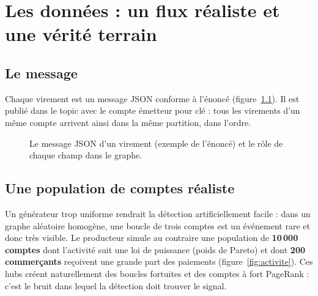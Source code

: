 \chapter{Les données : un flux réaliste et une vérité terrain}
\label{ch:donnees}

\section{Le message}
Chaque virement est un message JSON conforme à l'énoncé
(figure~\ref{fig:json}). Il est publié dans le topic 
avec le compte émetteur pour clé : tous les virements d'un même compte
arrivent ainsi dans la même partition, dans l'ordre.

\begin{figure}[htp]
\centering
{}
\caption[Le message JSON d'un virement]{Le message JSON d'un virement (exemple de l'énoncé) et le
rôle de chaque champ dans le graphe.}
\label{fig:json}
\end{figure}

\section{Une population de comptes réaliste}
Un générateur trop uniforme rendrait la détection artificiellement facile :
dans un graphe aléatoire homogène, une boucle de trois comptes est un
événement rare et donc très visible. Le producteur simule au contraire une
population de \textbf{10\,000 comptes} dont l'activité suit une loi de
puissance (poids de Pareto) et dont \textbf{200 commerçants} reçoivent une
grande part des paiements (figure~\ref{fig:activite}). Ces hubs créent
naturellement des boucles fortuites et des comptes à fort PageRank : c'est
le bruit dans lequel la détection doit trouver le signal.

